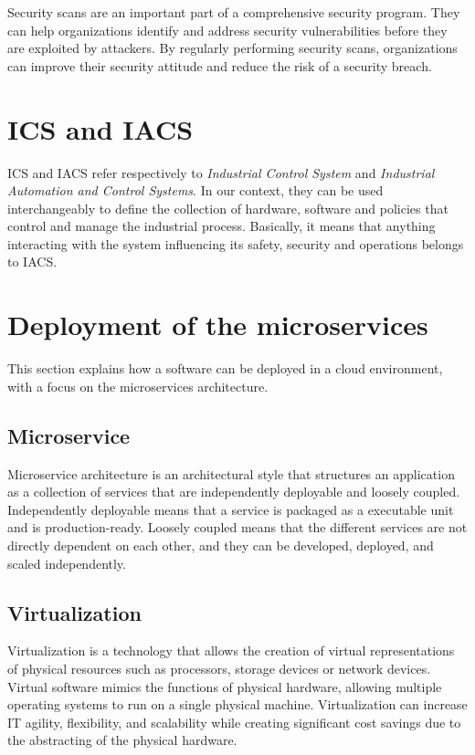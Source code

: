Security scans are an important part of a comprehensive security program. They can help organizations identify and address security vulnerabilities before they are exploited by attackers. By regularly performing security scans, organizations can improve their security attitude and reduce the risk of a security breach.

\section{ICS and IACS}

ICS and IACS refer respectively to \textit{Industrial Control System} and \textit{Industrial Automation and Control Systems}. In our context, they can be used interchangeably to define the collection of hardware, software and policies that control and manage the industrial process. Basically, it means that anything interacting with the system influencing its safety, security and operations belongs to IACS.~\cite{ics-or-iacs}

\section{Deployment of the microservices}

This section explains how a software can be deployed in a cloud environment, with a focus on the microservices architecture.


\subsection{Microservice}

Microservice architecture is an architectural style that structures an application as a collection of services that are independently deployable and loosely coupled. Independently deployable means that a service is packaged as a executable unit and is production-ready. Loosely coupled means that the different services are not directly dependent on each other, and they can be developed, deployed, and scaled independently.~\cite{microservices-what-are}

\subsection{Virtualization}

Virtualization is a technology that allows the creation of virtual representations of physical resources such as processors, storage devices or network devices. Virtual software mimics the functions of physical hardware, allowing multiple operating systems to run on a single physical machine. Virtualization can increase IT agility, flexibility, and scalability while creating significant cost savings due to the abstracting of the physical hardware.~\cite{virtualization-aws}

